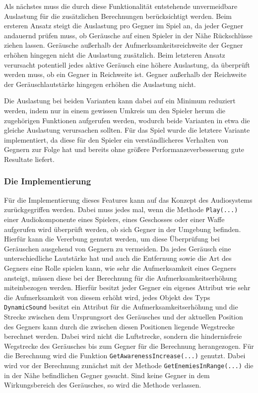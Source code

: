{Als nächstes muss die durch diese Funktionalität  entstehende unvermeidbare Auslastung für die zusätzlichen Berechnungen berücksichtigt werden. Beim ersteren Ansatz steigt die Auslastung pro Gegner im Spiel an, da jeder Gegner andauernd prüfen muss, ob Geräusche auf einen Spieler in der Nähe Rückschlüsse ziehen lassen. Geräusche außerhalb der Aufmerksamkeitsreichweite der Gegner erhöhen hingegen nicht die Auslastung zusätzlich. Beim letzteren Ansatz verursacht potentiell jedes aktive Geräusch eine höhere Auslastung, da überprüft werden muss, ob ein Gegner in Reichweite ist. Gegner außerhalb der Reichweite der Geräuschlautstärke hingegen erhöhen die Auslastung nicht.

Die Auslastung bei beiden Varianten kann dabei auf ein Minimum reduziert werden, indem nur in einem gewissen Umkreis um den Spieler herum die zugehörigen Funktionen aufgerufen werden, wodurch beide Varianten in etwa die gleiche Auslastung verursachen sollten. Für das Spiel wurde die letztere Variante implementiert, da diese für den Spieler ein verständlicheres Verhalten von Gegnern zur Folge hat und bereits ohne größere Performanzeverbesserung gute Resultate liefert.

\subsubsection{Die Implementierung}
Für die Implementierung dieses Features kann auf das Konzept des Audiosystems zurückgegriffen werden. Dabei muss jedes mal, wenn die Methode \texttt{Play(...)} einer Audiokomponente eines Spielers, eines Geschosses oder einer Waffe aufgerufen wird überprüft werden, ob sich Gegner in der Umgebung befinden. Hierfür kann die Vererbung genutzt werden, um diese Überprüfung bei Geräuschen ausgehend von Gegnern zu vermeiden. Da jedes Geräusch eine unterschiedliche Lautstärke hat und auch die Entfernung sowie die Art des Gegners eine Rolle spielen kann, wie sehr die Aufmerksamkeit eines Gegners ansteigt, müssen diese bei der Berechnung für die Aufmerksamkeitserhöhung miteinbezogen werden. Hierfür besitzt jeder Gegner ein eigenes Attribut wie sehr die Aufmerksamkeit von diesem erhöht wird, jedes Objekt des Typs \texttt{DynamicSound} besitzt ein Attribut für die Aufmerksamkeitserhöhung und die Strecke zwischen dem Ursprungsort des Geräusches und der aktuellen Position des Gegners kann durch die zwischen diesen Positionen liegende Wegstrecke berechnet werden. Dabei wird nicht die Luftstrecke, sondern die hindernisfreie Wegstrecke des Geräusches bis zum Gegner für die Berechnung herangezogen. Für die Berechnung wird die Funktion \texttt{GetAwarenessIncrease(...)} genutzt. Dabei wird vor der Berechnung zunächst mit der Methode \texttt{GetEnemiesInRange(...)} die in der Nähe befindlichen Gegner gesucht. Sind keine Gegner in dem Wirkungsbereich des Geräusches, so wird die Methode verlassen.

}
